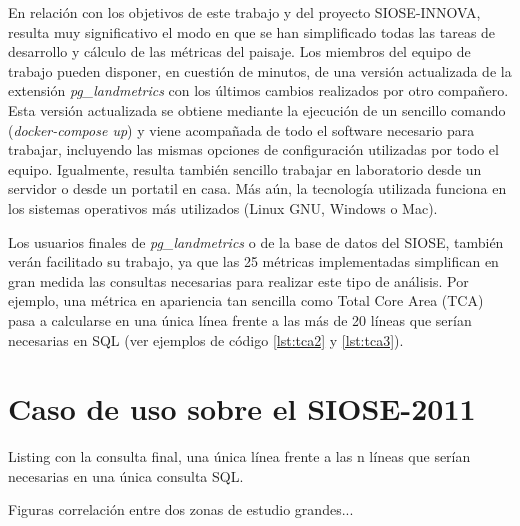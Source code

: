 En relación con los objetivos de este trabajo y del proyecto SIOSE-INNOVA, resulta muy significativo el modo en que se han simplificado todas las tareas de desarrollo y cálculo de las métricas del paisaje. Los miembros del equipo de trabajo pueden disponer, en cuestión de minutos, de una versión actualizada de la extensión \textit{pg\_landmetrics} con los últimos cambios realizados por otro compañero. Esta versión actualizada se obtiene mediante la ejecución de un sencillo comando (\textit{docker-compose up}) y viene acompañada de todo el software necesario para trabajar, incluyendo las mismas opciones de configuración utilizadas por todo el equipo. Igualmente, resulta también sencillo trabajar en laboratorio desde un servidor o desde un portatil en casa. Más aún, la tecnología utilizada funciona en los sistemas operativos más utilizados (Linux GNU, Windows o Mac). 

Los usuarios finales de \textit{pg\_landmetrics} o de la base de datos del SIOSE, también verán facilitado su trabajo, ya que las 25 métricas implementadas simplifican en gran medida las consultas necesarias para realizar este tipo de análisis. Por ejemplo, una métrica en apariencia tan sencilla como Total Core Area (TCA) pasa a calcularse en una única línea frente a las más de 20 líneas que serían necesarias en SQL (ver ejemplos de código \ref{lst:tca2} y \ref{lst:tca3}).


\section{Caso de uso sobre el SIOSE-2011 \label{sec:caso_uso}}


Listing con la consulta final, una única línea frente a las n líneas que serían necesarias en una única consulta SQL.

Figuras correlación entre dos zonas de estudio grandes...

